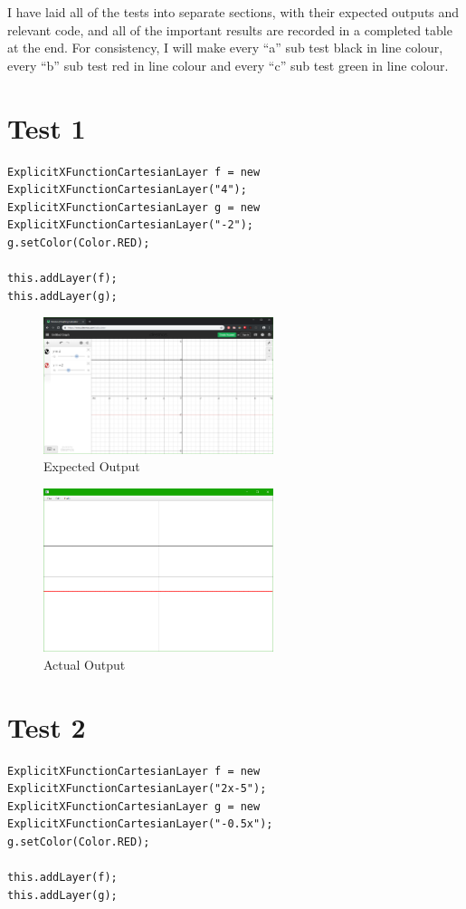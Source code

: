 \documentclass[../../../main.tex]{subfiles}
\begin{document}
I have laid all of the tests into separate sections, with their expected outputs and relevant code, and all of the important results are recorded in a completed table at the end. For consistency, I will make every ``a'' sub test black in line colour,  every ``b'' sub test red in line colour and  every ``c'' sub test green in line colour.
\newpage
\section{Test 1}
\begin{verbatim}
ExplicitXFunctionCartesianLayer f = new ExplicitXFunctionCartesianLayer("4");
ExplicitXFunctionCartesianLayer g = new ExplicitXFunctionCartesianLayer("-2");
g.setColor(Color.RED);

this.addLayer(f);
this.addLayer(g);
\end{verbatim}

\begin{figure}[H]
	\centering
	\includegraphics[width=0.6\textwidth]{tests/expected1}
	\caption{Expected Output}
\end{figure}

\begin{figure}[H]
	\centering
	\includegraphics[width=0.6\textwidth]{tests/actual1}
	\caption{Actual Output}
\end{figure}
\newpage

\section{Test 2}
\begin{verbatim}
ExplicitXFunctionCartesianLayer f = new ExplicitXFunctionCartesianLayer("2x-5");
ExplicitXFunctionCartesianLayer g = new ExplicitXFunctionCartesianLayer("-0.5x");
g.setColor(Color.RED);

this.addLayer(f);
this.addLayer(g);
\end{verbatim}
\end{document}
